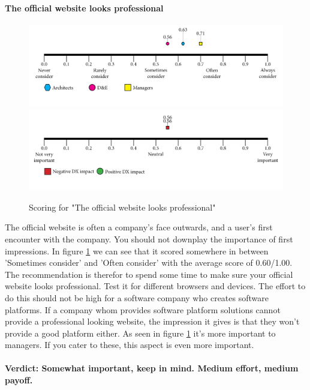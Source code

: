 \documentclass{article}
\begin{document}
\paragraph{The official website looks professional}
\begin{figure}[H]
\centering
\includegraphics[width=\linewidth]{scorelines/aspect8.png}
\includegraphics[width=\linewidth]{dxscorelines/dxaspect8.png}
\caption{Scoring for "The official website looks professional"}
\label{fig:aspect8}
\end{figure}
The official website is often a company's face outwards, and a user's first encounter with the company. You should not downplay the importance of first impressions. In figure \ref{fig:aspect8} we can see that it scored somewhere in between 'Sometimes consider' and 'Often consider' with the average score of 0.60/1.00. The recommendation is therefor to spend some time to make sure your official website looks professional. Test it for different browsers and devices. The effort to do this should not be high for a software company who creates software platforms. If a company whom provides software platform solutions cannot provide a professional looking website, the impression it gives is that they won't provide a good platform either. As seen in figure \ref{fig:aspect8} it's more important to managers. If you cater to these, this aspect is even more important.
\\ \\
\textbf{Verdict: Somewhat important, keep in mind. Medium effort, medium payoff.}
\end{document}
